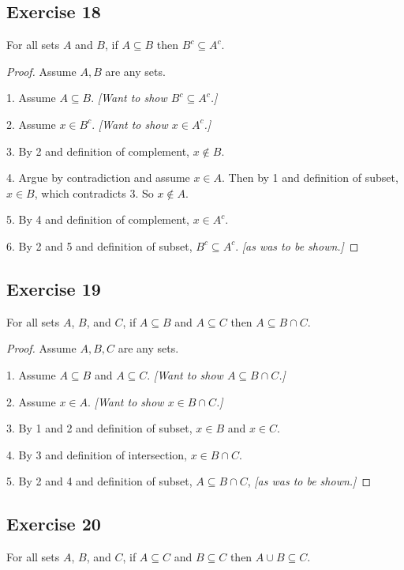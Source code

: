 \documentclass[14pt]{extarticle}
\begin{document}
\subsection{Exercise 18}
For all sets $A$ and $B$, if \(A \subseteq B\) then \(B^c \subseteq A^c\).

\begin{proof}
Assume $A,B$ are any sets.

1. Assume \(A \subseteq B\). {\it [Want to show \(B^c \subseteq A^c\).]}

2. Assume \(x \in B^c\). {\it [Want to show \(x \in A^c \).]}

3. By 2 and definition of complement, $x \notin B$.

4. Argue by contradiction and assume $x \in A$. Then by 1 and definition of subset, $x \in B$, which contradicts 3.
So $x \notin A$.

5. By 4 and definition of complement, $x \in A^c$.

6. By 2 and 5 and definition of subset, \(B^c \subseteq A^c\). {\it [as was to be shown.]}
\end{proof}

\subsection{Exercise 19}
For all sets $A$, $B$, and $C$, if \(A \subseteq B\) and \(A \subseteq C\) then \(A \subseteq B \cap C\).

\begin{proof}
Assume $A,B,C$ are any sets.

1. Assume \(A \subseteq B\) and \(A \subseteq C\). {\it [Want to show \(A \subseteq B \cap C\).]}

2. Assume \(x \in A\). {\it [Want to show \(x \in B \cap C\).]}

3. By 1 and 2 and definition of subset, $x \in B$ and $x \in C$.

4. By 3 and definition of intersection, \(x \in B \cap C\).

5. By 2 and 4 and definition of subset, \(A \subseteq B \cap C\), {\it [as was to be shown.]}
\end{proof}

\subsection{Exercise 20}
For all sets $A$, $B$, and $C$, if \(A \subseteq C\) and \(B \subseteq C\) then \(A \cup B \subseteq C\).
\end{document}

